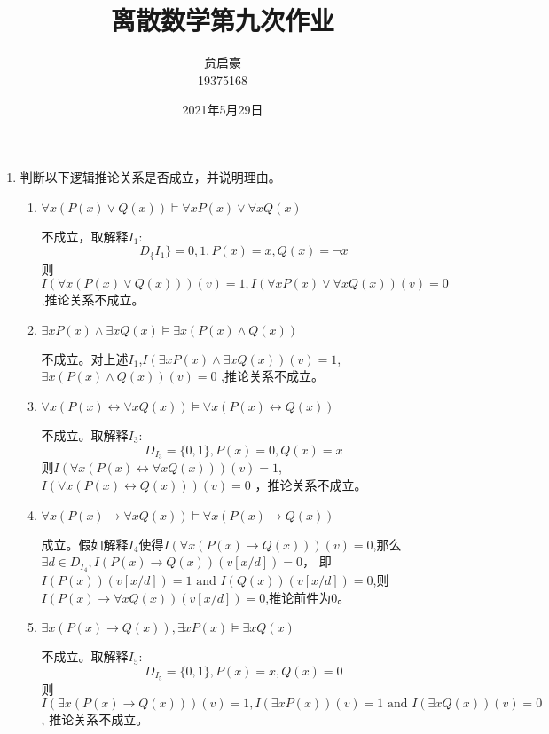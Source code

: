 \documentclass[UTF8]{ctexart}
\title{离散数学第九次作业}
\author{贠启豪\\19375168}
\date{2021年5月29日}
\begin{document}
    \maketitle
    \begin{enumerate}
        \item 判断以下逻辑推论关系是否成立，并说明理由。
        \begin{enumerate}
            \item $\forall x(P(x) \vee  Q(x)) \models  \forall xP(x) \vee  \forall xQ(x)$
            
            不成立，取解释$I_1$:
            \[
                D_\{I_1\}={0,1},P(x)=x,Q(x)=\neg x
            \]
            则$I(\forall x(P(x)\vee Q(x)))(v)=1,I(\forall xP(x)\vee \forall xQ(x))(v)=0$,推论关系不成立。

            \item $\exists xP(x) \wedge  \exists xQ(x) \models  \exists x(P(x) \wedge  Q(x))$
            
            不成立。对上述$I_1$,$I(\exists xP(x)\wedge \exists xQ(x))(v)=1$,$\exists x(P(x)\wedge Q(x))(v)=0$
            ,推论关系不成立。

            \item $\forall x(P(x) \leftrightarrow  \forall xQ(x)) \models  \forall x(P(x) \leftrightarrow  Q(x))$
            
            不成立。取解释$I_3$:
            \[
                D_{I_3}=\{0,1\},P(x)=0,Q(x)=x
            \]
            则$I(\forall x(P(x)\leftrightarrow \forall xQ(x)))(v)=1$,$I(\forall x(P(x)\leftrightarrow Q(x)))(v)=0$
            ，推论关系不成立。
            
            \item $\forall x(P(x) \rightarrow  \forall xQ(x)) \models  \forall x(P(x) \rightarrow  Q(x))$
            
            成立。假如解释$I_4$使得$I(\forall x(P(x)\rightarrow Q(x)))(v)=0$,那么$\exists d\in D_{I_4},I(P(x)\rightarrow Q(x))(v[x/d])=0$，
            即$I(P(x))(v[x/d])=1 \text{ and }I(Q(x))(v[x/d])=0$,则$I(P(x)\rightarrow \forall xQ(x))(v[x/d])=0$,推论前件为0。

            
            \item $\exists x(P(x) \rightarrow  Q(x)), \exists xP(x) \models  \exists xQ(x)$
            
            不成立。取解释$I_5$:
            \[
                D_{I_5}=\{0,1\},P(x)=x,Q(x)=0
            \]
            则$I(\exists x(P(x)\rightarrow Q(x)))(v)=1,I(\exists xP(x))(v)=1 \text{ and } I(\exists xQ(x))(v)=0$,
            推论关系不成立。


\end{enumerate}
\end{enumerate}
\end{document}
